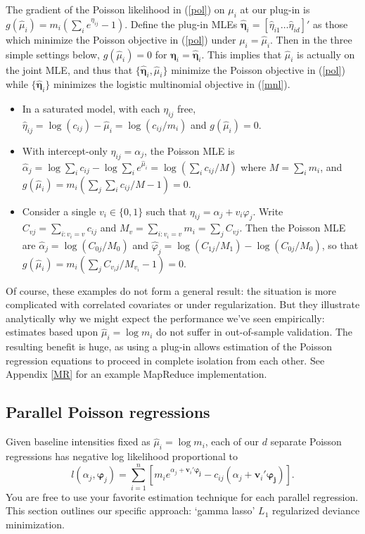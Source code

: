\documentclass[12pt]{article}
\newcommand{\bs}[1]{\boldsymbol{#1}}
\newcommand{\bm}[1]{\mathbf{#1}}
\begin{document}
The gradient of the Poisson likelihood in (\ref{pol}) on $\mu_i$ at our
plug-in is $g(\hat \mu_i) = m_i \left(\sum_i e^{\eta_{ij}}-1\right)$.  
Define the plug-in MLEs $\bs{\hat\eta}_{i}
  = [\hat\eta_{i1}\ldots\hat\eta_{id}]'$ as those which minimize the Poisson
  objective in (\ref{pol}) under $\mu_i=\hat\mu_i$.  Then in the
three simple settings below, $g(\hat
\mu_i)=0$ for $\bs{\eta}_i = \bs{\hat\eta}_{i}$. This implies that $\hat\mu_i$
is actually on the joint MLE, and thus that $\{\bs{\hat\eta}_{i},\hat\mu_i\}$ minimize the
 Poisson objective in (\ref{pol}) while $\{ \bs{\hat\eta}_{i}\}$ minimizes the logistic multinomial objective in (\ref{mnl}).
\begin{itemize}
\item In a saturated model, with
each $\eta_{ij}$ free, $\hat
\eta_{ij} = \log(c_{ij}) - \hat \mu_i = \log(c_{ij}/m_i)$ and $g(\hat
\mu_i) = 0$.
\item With intercept-only $\eta_{ij} =
\alpha_j$, the Poisson MLE is $\hat\alpha_j = \log \sum_i c_{ij} - \log
\sum_i e^{\hat\mu_i} = \log\left( \sum_i c_{ij}/M \right)$ where $M = \sum_i
m_i$, and $g(\hat \mu_i) = m_i(\sum_j \sum_i c_{ij}/M -1) = 0$.
\item Consider a single
$v_i \in
\{0,1\}$ such that $\eta_{ij} = \alpha_j + v_i \varphi_j$.  Write $C_{vj} = \sum_{i: v_i=v} c_{ij}$ and  $M_{v} = \sum_{i:
v_i=v} m_i = \sum_j C_{vj}$.  Then the Poisson MLE are $\hat\alpha_j =
\log(C_{0j}/M_0)$ and $\hat\varphi_j = \log(C_{1j}/M_1) - \log(C_{0j}/M_0)$,
so that  $g(\hat \mu_i) = m_i\left(\sum_j C_{v_ij}/M_{v_i} -1 \right) =0$.
\end{itemize}
Of course, these examples do not form a general result: the situation is more
complicated with correlated covariates or under regularization. But they
illustrate analytically why we might expect the performance we've seen
empirically: estimates based upon $\hat \mu_i = \log m_i$ do not suffer in
out-of-sample validation. The resulting benefit is huge, as using a plug-in
allows estimation of the Poisson regression equations to proceed in complete
isolation from each other.  See Appendix \ref{MR} for an example MapReduce implementation.

\subsection{Parallel Poisson regressions}
\label{GL}

Given baseline intensities fixed as $\hat \mu_i = \log m_i$, each of our $d$
separate Poisson regressions has negative log likelihood proportional to
\begin{equation}\label{obj}
l(\alpha_j, \bs{\varphi}_j) = \sum_{i=1}^n \left[ m_i 
e^{\alpha_j + \bm{v}_i'\bs{\varphi_j}} - c_{ij}(\alpha_j + \bm{v}_i'\bs{\varphi_j})\right].
\end{equation}
You are free to use your favorite estimation technique for each parallel
regression. This section outlines our specific approach:  `gamma lasso' $L_1$ regularized deviance minimization.
\end{document}
